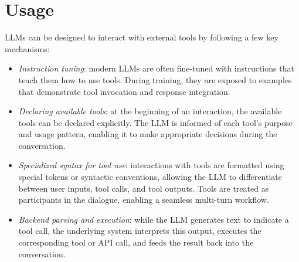 \section{Usage}

LLMs can be designed to interact with external tools by following a few key mechanisms:
\begin{itemize}
    \item \textit{Instruction tuning}: modern LLMs are often fine-tuned with instructions that teach them how to use tools. 
        During training, they are exposed to examples that demonstrate tool invocation and response integration.
    \item \textit{Declaring available tools}: at the beginning of an interaction, the available tools can be declared explicitly. 
        The LLM is informed of each tool's purpose and usage pattern, enabling it to make appropriate decisions during the conversation.
    \item \textit{Specialized syntax for tool use}: interactions with tools are formatted using special tokens or syntactic conventions, allowing the LLM to differentiate between user inputs, tool calls, and tool outputs. 
        Tools are treated as participants in the dialogue, enabling a seamless multi-turn workflow.
    \item \textit{Backend parsing and execution}: while the LLM generates text to indicate a tool call, the underlying system interprets this output, executes the corresponding tool or API call, and feeds the result back into the conversation.
\end{itemize}
